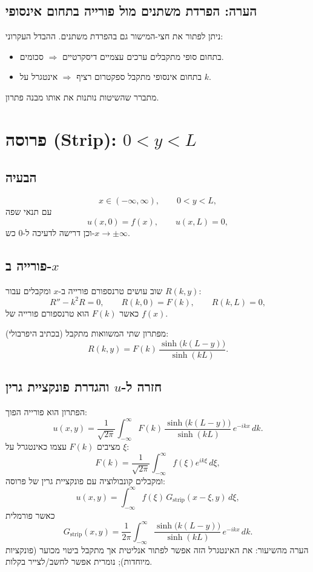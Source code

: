 \subsection{הערה: הפרדת משתנים מול פורייה בתחום אינסופי}
ניתן לפתור את חצי-המישור גם בהפרדת משתנים. ההבדל העקרוני:
\begin{itemize}
  \item בתחום סופי מתקבלים ערכים עצמיים דיסקרטיים $\Rightarrow$ סכומים.
  \item בתחום אינסופי מתקבל ספקטרום רציף $\Rightarrow$ אינטגרל על $k$.
\end{itemize}
מתברר שהשיטות נותנות את אותו מבנה פתרון.

\section{פרוסה (Strip): \(0<y<L\)}
\subsection{הבעיה}
\[
x\in(-\infty,\infty),\qquad 0<y<L,
\]
עם תנאי שפה
\begin{equation}
u(x,0)=f(x),\qquad u(x,L)=0,
\end{equation}
וכן דרישה לדעיכה ל-$0$ כש-$x\to\pm\infty$.

\subsection{פורייה ב-\(x\)}
שוב עושים טרנספורם פורייה ב-$x$ ומקבלים עבור $R(k,y)$:
\begin{equation}
R''-k^2R=0,\qquad
R(k,0)=F(k),\qquad
R(k,L)=0,
\end{equation}
כאשר $F(k)$ הוא טרנספורם פורייה של $f(x)$.

מפתרון שתי המשוואות מתקבל (בכתיב היפרבולי):
\begin{equation}
R(k,y)=F(k)\,\frac{\sinh\big(k(L-y)\big)}{\sinh(kL)}.
\end{equation}

\subsection{חזרה ל-\(u\) והגדרת פונקציית גרין}
הפתרון הוא פורייה הפוך:
\begin{equation}
u(x,y)=\frac{1}{\sqrt{2\pi}}\int_{-\infty}^{\infty}
F(k)\,\frac{\sinh\big(k(L-y)\big)}{\sinh(kL)}\,e^{-ikx}\,dk.
\end{equation}
מציבים $F(k)$ עצמו כאינטגרל על $\xi$:
\[
F(k)=\frac{1}{\sqrt{2\pi}}\int_{-\infty}^{\infty} f(\xi)e^{ik\xi}\,d\xi,
\]
ומקבלים קונבולוציה עם פונקציית גרין של פרוסה:
\begin{equation}
u(x,y)=\int_{-\infty}^{\infty} f(\xi)\,G_{\text{strip}}(x-\xi,y)\,d\xi,
\end{equation}
כאשר פורמלית
\begin{equation}
G_{\text{strip}}(x,y)=\frac{1}{2\pi}\int_{-\infty}^{\infty}
\frac{\sinh\big(k(L-y)\big)}{\sinh(kL)}\,e^{-ikx}\,dk.
\end{equation}
הערה מהשיעור: את האינטגרל הזה אפשר לפתור אנליטית אך מתקבל ביטוי מכוער (פונקציות מיוחדות); נומרית אפשר לחשב/לצייר בקלות.

